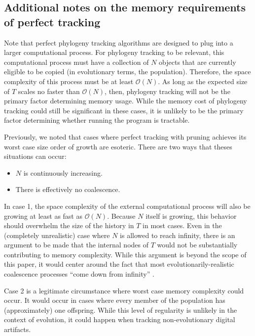 \subsection{Additional notes on the memory requirements of perfect tracking} \label{sec:perfect-tracking-space-supp}

Note that perfect phylogeny tracking algorithms are designed to plug into a larger computational process.
For phylogeny tracking to be relevant, this computational process must have a collection of $N$ objects that are currently eligible to be copied (in evolutionary terms, the population).
Therefore, the space complexity of this process must be at least $\mathcal{O}(N)$.
As long as the expected size of $T$ scales no faster than $\mathcal{O}(N)$, then, phylogeny tracking will not be the primary factor determining memory usage.
While the memory cost of phylogeny tracking could still be significant in these cases, it is unlikely to be the primary factor determining whether running the program is tractable.

Previously, we noted that cases where perfect tracking with pruning achieves its worst case size order of growth are esoteric.
There are two ways that theses situations can occur:

\begin{itemize}
\item $N$ is continuously increasing.
\item There is effectively no coalescence.
\end{itemize}

In case 1, the space complexity of the external computational process will also be growing at least as fast as $\mathcal{O}(N)$.
Because $N$ itself is growing, this behavior should overwhelm the size of the history in $T$ in most cases.
Even in the (completely unrealistic) case where $N$ is allowed to reach infinity, there is an argument to be made that the internal nodes of $T$ would not be substantially contributing to memory complexity.
While this argument is beyond the scope of this paper, it would center around the fact that most evolutionarily-realistic coalescence processes ``come down from infinity'' \citep{berestycki2009recent}.

Case 2 is a legitimate circumstance where worst case memory complexity could occur. 
It would occur in cases where every member of the population has (approximately) one offspring.
While this level of regularity is unlikely in the context of evolution, it could happen when tracking non-evolutionary digital artifacts.